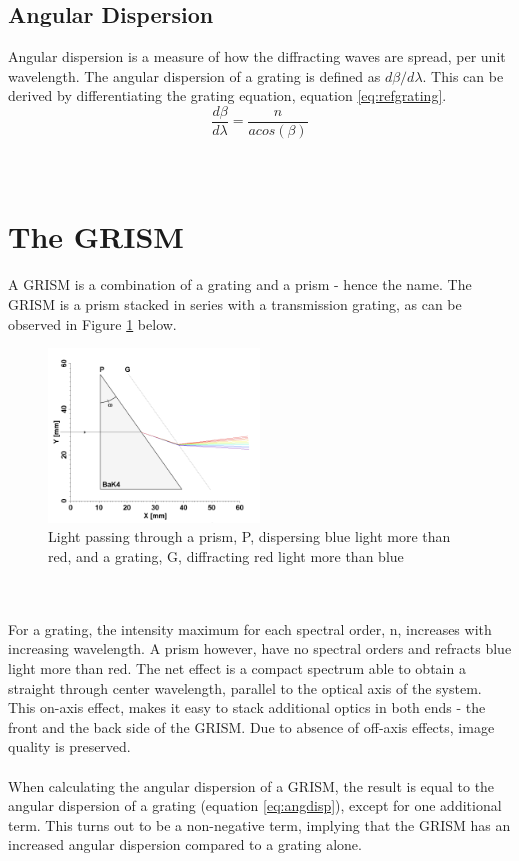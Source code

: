 \subsection{Angular Dispersion}
Angular dispersion is a measure of how the diffracting waves are spread, per unit wavelength. The angular dispersion of a grating is defined as $d\beta/d\lambda$. This can be derived by differentiating the grating equation, equation \ref{eq:refgrating}. 
\begin{equation}
    \frac{d\beta}{d\lambda} = \frac{n}{a cos(\beta)}
    \label{eq:angdisp}
\end{equation}
\\\\
\section{The GRISM} \label{sec:grism}
A GRISM is a combination of a grating and a prism - hence the name. The GRISM is a prism stacked in series with a transmission grating, as can be observed in Figure \ref{fig:grism} below.
\begin{figure}[H]
    \centering
    \includegraphics[width=0.5\textwidth]{Images/theory/GRISM.png}
    \caption{Light passing through a prism, P, dispersing blue light more than red, and a grating, G, diffracting red light more than blue}
    \label{fig:grism}
\end{figure}
\\\\
\noindent
For a grating, the intensity maximum for each spectral order, n, increases with increasing wavelength. A prism however, have no spectral orders and refracts blue light more than red. The net effect is a compact spectrum able to obtain a straight through center wavelength, parallel to the optical axis of the system. This on-axis effect, makes it easy to stack additional optics in both ends - the front and the back side of the GRISM. Due to absence of off-axis effects, image quality is preserved.
\\\\
When calculating the angular dispersion of a GRISM, the result is equal to the angular dispersion of a grating (equation \ref{eq:angdisp}), except for one additional term. This turns out to be a non-negative term, implying that the GRISM has an increased angular dispersion compared to a grating alone.

